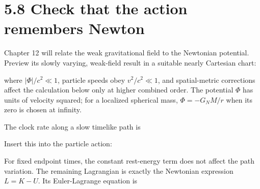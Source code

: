 \documentclass[
  11pt,
  letterpaper,
  oneside,
  openany]{scrbook}
\begin{document}
\hypertarget{check-that-the-action-remembers-newton}{%
\section{5.8 Check that the action remembers
Newton}\label{check-that-the-action-remembers-newton}}

Chapter 12 will relate the weak gravitational field to the Newtonian
potential. Preview its slowly varying, weak-field result in a suitable
nearly Cartesian chart:

\begin{center}
\begingroup
{}
\ifdim\wd\grmathbox>\linewidth
\resizebox{\linewidth}{!}{\usebox{\grmathbox}}
\else\usebox{\grmathbox}\fi
\endgroup
\end{center}

where \(|\Phi|/c^2\ll1\), particle speeds obey \(v^2/c^2\ll1\), and
spatial-metric corrections affect the calculation below only at higher
combined order. The potential \(\Phi\) has units of velocity squared;
for a localized spherical mass, \(\Phi=-G_NM/r\) when its zero is chosen
at infinity.

The clock rate along a slow timelike path is

\begin{center}
\begingroup
{}
\ifdim\wd\grmathbox>\linewidth
\resizebox{\linewidth}{!}{\usebox{\grmathbox}}
\else\usebox{\grmathbox}\fi
\endgroup
\end{center}

Insert this into the particle action:

\begin{center}
\begingroup
{}
\ifdim\wd\grmathbox>\linewidth
\resizebox{\linewidth}{!}{\usebox{\grmathbox}}
\else\usebox{\grmathbox}\fi
\endgroup
\end{center}

For fixed endpoint times, the constant rest-energy term does not affect
the path variation. The remaining Lagrangian is exactly the Newtonian
expression \(L=K-U\). Its Euler-Lagrange equation is
\end{document}
